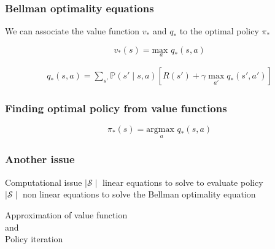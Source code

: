 \documentclass[dvipsnames,svgnames]{beamer}
\begin{document}
\begin{frame}
\frametitle{Bellman optimality equations}

We can associate the value function $v_*$ and $q_*$ to the optimal policy $\pi_{*}$   

\begin{block}{}

\begin{equation*}
v_{*}(s)=\underset{a}{\text{max }} q_{*}(s,a)
\end{equation*}
\end{block}

\begin{block}{}
\begin{equation*}
\begin{split}
q_{*}(s,a) = \sum_{s'}\mathbb{P}(s' \mid s,a)[R(s')+\gamma \max_{a'}q_{*}(s',a')]
\end{split}
\end{equation*}
\end{block}

\end{frame}


\begin{frame}
\frametitle{Finding optimal policy from value functions}
\begin{block}{}

$$\pi_{*}(s)= \underset{a}{\text{argmax }}q_*(s,a)$$
\end{block}
\end{frame}

\begin{frame}
\frametitle{Another issue}
\begin{alertblock}{Computational issue}
$\mid \mathcal{S} \mid $ linear equations to solve to evaluate policy\\
$\mid \mathcal{S} \mid $ non linear equations to solve the Bellman optimality equation 
\end{alertblock}

\pause 
\vspace{1cm}
\centering
Approximation of value function
\\ and
\\Policy iteration

\end{frame}
\end{document}
